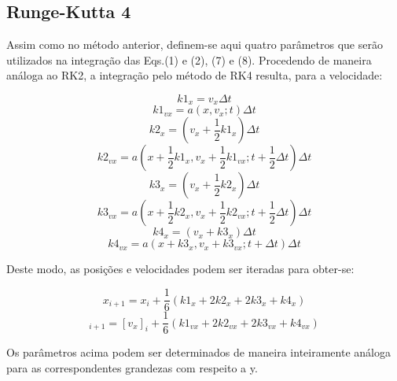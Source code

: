 \documentclass[a4paper, brazilian, 8pt, final]{article}
\begin{document}
\begin{multicols}{2}
\subsection{Runge-Kutta 4}
\quad Assim como no método anterior, definem-se aqui quatro parâmetros que serão utilizados na integração das Eqs.(1) e (2), (7) e (8). Procedendo de maneira análoga ao RK2, a integração pelo método de RK4 resulta, para a velocidade:

\begin{equation}
k1_{x} = v_{x}\Delta t 
\end{equation}
\begin{equation}
k1_{vx} = a(x,v_{x};t)\Delta t 
\end{equation} 
\begin{equation}
k2_{x} = (v_{x} + \frac{1}{2}k1_{x})\Delta t
\end{equation} 
\begin{equation}
k2_{vx} = a(x + \frac{1}{2}k1_{x},v_{x} + \frac{1}{2}k1_{vx};t + \frac{1}{2}\Delta t)\Delta t
\end{equation} 
\begin{equation}
k3_{x} = (v_{x} + \frac{1}{2}k2_{x})\Delta t
\end{equation}
\begin{equation}
k3_{vx} = a(x + \frac{1}{2}k2_{x},v_{x} + \frac{1}{2}k2_{vx};t + \frac{1}{2}\Delta t)\Delta t
\end{equation} 
\begin{equation}
k4_{x} = (v_{x} + k3_{x})\Delta t
\end{equation}
\begin{equation}
k4_{vx} = a(x + k3_{x},v_{x} + k3_{vx};t + \Delta t)\Delta t
\end{equation}  

\quad Deste modo, as posições e velocidades podem ser iteradas para obter-se:

\begin{equation}
x_{i + 1} = x_{i} + \frac{1}{6}(k1_{x} + 2k2_{x} + 2k3_{x} + k4_{x})
\end{equation}
\begin{equation}
[v_x]_{i + 1} = [v_x]_{i} + \frac{1}{6}(k1_{vx} + 2k2_{vx} + 2k3_{vx} + k4_{vx})
\end{equation}

\quad Os parâmetros acima podem ser determinados de maneira inteiramente análoga para as correspondentes grandezas com respeito a y.
\end{multicols}
\end{document}
